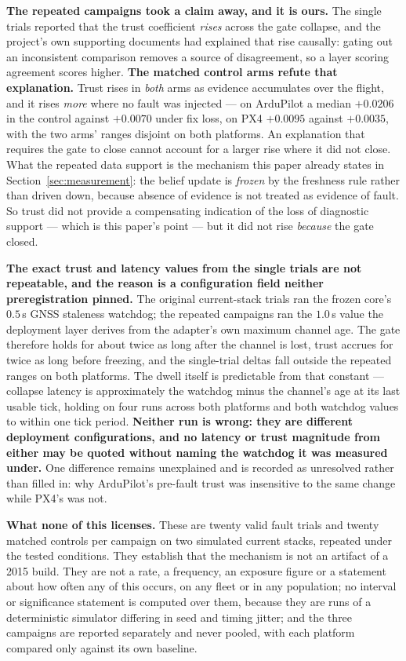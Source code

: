 \documentclass[11pt,a4paper]{article}
\begin{document}
\textbf{The repeated campaigns took a claim away, and it is ours.} The single
trials reported that the trust coefficient \emph{rises} across the gate
collapse, and the project's own supporting documents had explained that rise
causally: gating out an inconsistent comparison removes a source of
disagreement, so a layer scoring agreement scores higher. \textbf{The matched
control arms refute that explanation.} Trust rises in \emph{both} arms as
evidence accumulates over the flight, and it rises \emph{more} where no fault
was injected --- on ArduPilot a median $+0.0206$ in the control against
$+0.0070$ under fix loss, on PX4 $+0.0095$ against $+0.0035$, with the two
arms' ranges disjoint on both platforms. An explanation that requires the gate
to close cannot account for a larger rise where it did not close. What the
repeated data support is the mechanism this paper already states in
Section~\ref{sec:measurement}: the belief update is \emph{frozen} by the
freshness rule rather than driven down, because absence of evidence is not
treated as evidence of fault. So trust did not provide a compensating
indication of the loss of diagnostic support --- which is this paper's point
--- but it did not rise \emph{because} the gate closed.

\textbf{The exact trust and latency values from the single trials are not
repeatable, and the reason is a configuration field neither preregistration
pinned.} The original current-stack trials ran the frozen core's $0.5$\,s GNSS
staleness watchdog; the repeated campaigns ran the $1.0$\,s value the
deployment layer derives from the adapter's own maximum channel age. The gate
therefore holds for about twice as long after the channel is lost, trust
accrues for twice as long before freezing, and the single-trial deltas fall
outside the repeated ranges on both platforms. The dwell itself is predictable
from that constant --- collapse latency is approximately the watchdog minus the
channel's age at its last usable tick, holding on four runs across both
platforms and both watchdog values to within one tick period. \textbf{Neither
run is wrong: they are different deployment configurations, and no latency or
trust magnitude from either may be quoted without naming the watchdog it was
measured under.} One difference remains unexplained and is recorded as
unresolved rather than filled in: why ArduPilot's pre-fault trust was
insensitive to the same change while PX4's was not.

\textbf{What none of this licenses.} These are twenty valid fault trials and
twenty matched controls per campaign on two simulated current stacks, repeated
under the tested conditions. They establish that the mechanism is not an
artifact of a 2015 build. They are not a rate, a frequency, an exposure figure
or a statement about how often any of this occurs, on any fleet or in any
population; no interval or significance statement is computed over them,
because they are runs of a deterministic simulator differing in seed and
timing jitter; and the three campaigns are reported separately and never
pooled, with each platform compared only against its own baseline.
\end{document}
